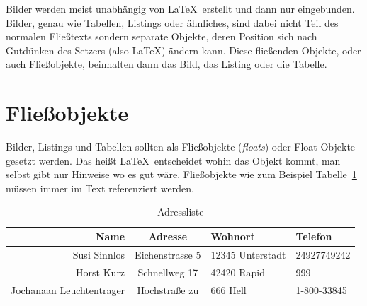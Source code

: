 \documentclass[11pt,a4paper]{report}
\begin{document}
Bilder werden meist unabhängig von \LaTeX\ erstellt und dann nur 
eingebunden. 
Bilder, genau wie Tabellen, Listings oder ähnliches, sind dabei nicht 
Teil des normalen Fließtexts sondern separate Objekte, 
deren Position sich nach Gutdünken des Setzers (also \LaTeX) 
ändern kann.
Diese fließenden Objekte, oder auch Fließobjekte,
beinhalten dann das Bild, das Listing oder die Tabelle.


\section{Fließobjekte}

Bilder, Listings und Tabellen sollten als Fließobjekte (\emph{floats}) 
oder Float-Objekte gesetzt werden.
Das heißt \LaTeX\ entscheidet wohin das Objekt kommt, man selbst
gibt nur Hinweise wo es gut wäre.
Fließobjekte wie zum Beispiel Tabelle~\ref{tab:meinetab} müssen immer im 
Text referenziert werden.

\begin{table}[htbp] %
\centering
\begin{tabular}{|r|c|l|l|}
\hline
\textbf{Name} & \textbf{Adresse} & \textbf{Wohnort} & \textbf{Telefon} \\ 
\hline\hline
Susi Sinnlos & Eichenstrasse 5 & 12345 Unterstadt & 24927749242 \\
Horst Kurz & Schnellweg 17 & 42420 Rapid & 999 \\\hline
Jochanaan Leuchtentrager & Hochstraße zu & 666 Hell & 1-800-33845\\\hline
\end{tabular}
\caption{Adressliste}
\label{tab:meinetab}
\end{table}
\end{document}
